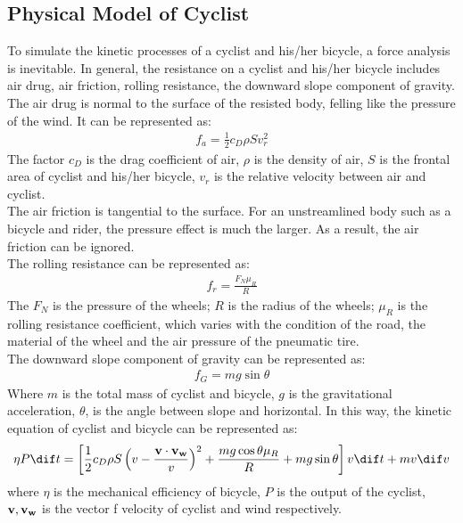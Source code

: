 \documentclass{mcmthesis}
\begin{document}
  \subsection{Physical Model of Cyclist}
  To simulate the kinetic processes of a cyclist and his/her bicycle, a force analysis is inevitable. In general, the resistance on a cyclist and his/her bicycle includes air drug, air friction, rolling resistance, the downward slope component of gravity. \\
  The air drug is normal to the surface of the resisted body, felling like the pressure of the wind. It can be represented as: 
  \begin{equation}
    \begin{aligned}
      f_{a} = \frac{1}{2} c_{D} \rho S v_{r} ^{2}
    \end{aligned}
  \end{equation}
  The factor $c_D$ is the drag coefficient of air, $\rho$ is the density of air, $S$ is the frontal area of cyclist and his/her bicycle, $v_{r}$ is the relative velocity between air and cyclist. \\
  The air friction is tangential to the surface. For an unstreamlined body such as a bicycle and rider, the pressure effect is much the larger. As a result, the air friction can be ignored.\\
  The rolling resistance can be represented as: 
  \begin{equation}
    \begin{aligned}
      f_{r} = \frac{F_{N} \mu_{R}}{R}
    \end{aligned}
  \end{equation}
  The $F_{N}$ is the pressure of the wheels; $R$ is the radius of the wheels; $\mu_{R}$ is the rolling resistance coefficient, which varies with the condition of the road, the material of the wheel and the air pressure of the pneumatic tire. \\
  The downward slope component of gravity can be represented as: 
  \begin{equation}
    \begin{aligned}
      f_{G} = mg\sin \theta
    \end{aligned}
  \end{equation}
  Where $m$ is the total mass of cyclist and bicycle, $g$ is the gravitational acceleration, $\theta$, is the angle between slope and horizontal. 
  In this way, the kinetic equation of cyclist and bicycle can be represented as:
  \begin{equation}
    \begin{aligned}
      \eta P \dif t = \left[ \frac{1}{2} c_{D} \rho S \left(v - \frac{{\bf v\cdot v_{w}}}{v}\right)^{2} + \frac{mg\cos \theta \mu_{R}}{R} + mg\sin \theta \right]v\dif t + mv \dif v
    \end{aligned}
  \end{equation}
  where $\eta$ is the mechanical efficiency of bicycle, $P$ is the output of the cyclist, ${\bf v,v_{w}}$ is the vector f velocity of cyclist and wind respectively.
\end{document}
